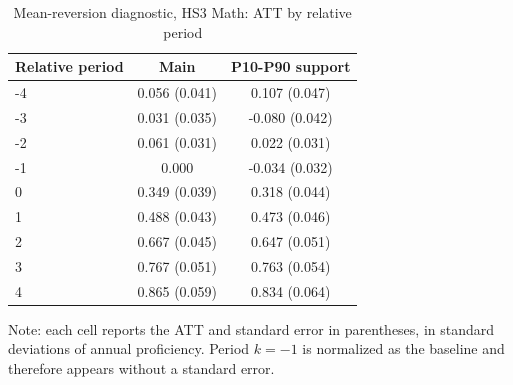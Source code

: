 ﻿\begin{table}[!htbp]
\centering
\caption{Mean-reversion diagnostic, HS3 Math: ATT by relative period}
\label{tab:ap_event_regmedia_HS3_mat}
\vspace{-0.15cm}
\scriptsize
\setlength{\tabcolsep}{4pt}
\renewcommand{\arraystretch}{0.92}
\begin{tabular}{lcc}
\toprule
Relative period & Main & P10-P90 support \\
\midrule
-4 & 0.056 (0.041) & 0.107 (0.047) \\
-3 & 0.031 (0.035) & -0.080 (0.042) \\
-2 & 0.061 (0.031) & 0.022 (0.031) \\
-1 & 0.000 & -0.034 (0.032) \\
0 & 0.349 (0.039) & 0.318 (0.044) \\
1 & 0.488 (0.043) & 0.473 (0.046) \\
2 & 0.667 (0.045) & 0.647 (0.051) \\
3 & 0.767 (0.051) & 0.763 (0.054) \\
4 & 0.865 (0.059) & 0.834 (0.064) \\
\bottomrule
\end{tabular}
\begin{flushleft}
\footnotesize Note: each cell reports the ATT and standard error in parentheses, in standard deviations of annual proficiency. Period \(k=-1\) is normalized as the baseline and therefore appears without a standard error.
\end{flushleft}
\end{table}



